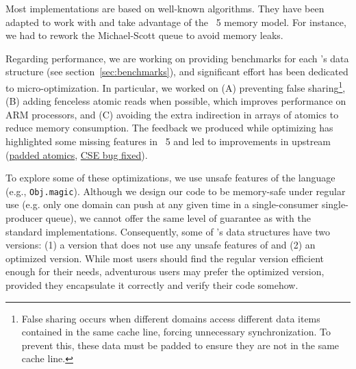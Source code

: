 \documentclass[a4paper, 11pt]{article}
\begin{document}
Most implementations are based on well-known algorithms.
They have been adapted to work with and take advantage of the \OCaml~5 memory model.
For instance, we had to rework the Michael-Scott queue to avoid memory leaks.

Regarding performance, we are working on providing benchmarks for each \Saturn's data structure (see section~\ref{sec:benchmarks}), and significant effort has been dedicated to micro-optimization. In particular, we worked on
(A) preventing false sharing\footnote[1]{False sharing occurs when different domains access different data items contained in the same cache line, forcing unnecessary synchronization. To prevent this, these data must be padded to ensure they are not in the same cache line.},
(B) adding fenceless atomic reads when possible, which improves performance on ARM processors, and
(C) avoiding the extra indirection in arrays of atomics to reduce memory consumption.
The feedback we produced while optimizing \Saturn has highlighted some missing features in \OCaml~5 and led to improvements in upstream \OCaml (\href{https://github.com/ocaml/ocaml/pull/12212}{padded atomics}, \href{https://github.com/ocaml/ocaml/pull/12715}{CSE bug fixed}).

To explore some of these optimizations, we use unsafe features of the language (e.g., \texttt{Obj.magic}). Although we design our code to be memory-safe under regular use (e.g. only one domain can push at any given time in a single-consumer single-producer queue), we cannot offer the same level of guarantee as with the standard implementations. Consequently, some of \Saturn's data structures have two versions: (1) a version that does not use any unsafe features of \OCaml and (2) an optimized version. While most users should find the regular version efficient enough for their needs, adventurous users may prefer the optimized version, provided they encapsulate it correctly and verify their code somehow.


\end{document}

